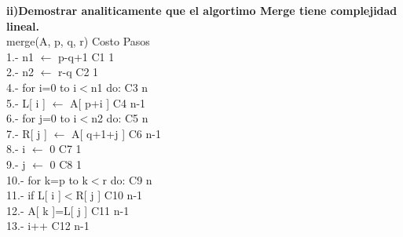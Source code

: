 \documentclass[spanish]{article}
\begin{document}
	\newpage
	{\large{\bf ii)Demostrar analiticamente que el algortimo Merge tiene complejidad lineal.}}\\
		merge(A, p, q, r)  \hspace{4cm} Costo \hspace{4cm} Pasos\\
	1.- n1 $\leftarrow$ p-q+1\hspace{4.5cm} C1 \hspace{5cm} 1 \\
	2.- n2 $\leftarrow$ r-q\hspace{5.1cm} C2 \hspace{5cm} 1\\
	4.- for i=0 to i$<$n1 do:\hspace{3.3cm} C3 \hspace{5cm} n \\
	5.- \hspace{0.7cm}L[ i ] $\leftarrow$ A[ p+i ]  \hspace{2.9cm} C4 \hspace{5cm} n-1 \\
	6.- for j=0 to i$<$n2 do:\hspace{3.3cm} C5 \hspace{5cm} n \\
	7.- \hspace{0.7cm}R[ j ] $\leftarrow$ A[ q+1+j ]  \hspace{2.3cm} C6 \hspace{5cm} n-1 \\
	8.- i $\leftarrow$ 0\hspace{5.8cm} C7 \hspace{5cm} 1 \\
	9.- j $\leftarrow$ 0\hspace{5.8cm} C8 \hspace{5cm} 1\\
	10.- for k=p to k$<$r do:\hspace{3.2cm} C9 \hspace{5cm} n \\
	11.- \hspace{0.5cm}if L[ i ]$<$R[ j ]  \hspace{3.5cm} C10 \hspace{4.8cm} n-1 \\
	12.-\hspace{1cm} A[ k ]=L[ j ] \hspace{3.3cm} C11 \hspace{4.8cm} n-1\\
	13.- \hspace{1cm} i++ \hspace{4.6cm} C12 \hspace{4.8cm} n-1\\
\end{document}
